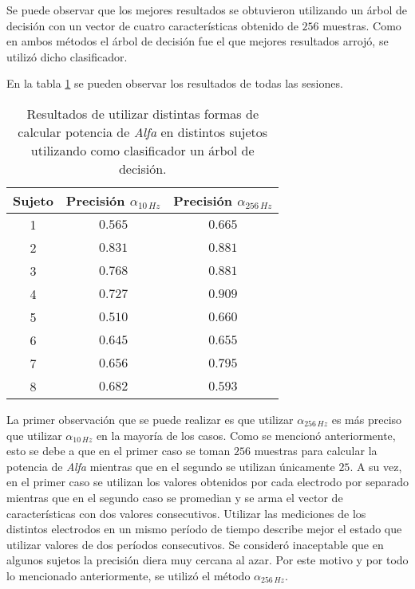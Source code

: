 Se puede observar que los mejores resultados se obtuvieron utilizando un árbol de decisión con un vector de cuatro características obtenido de $256$ muestras. Como en ambos métodos el árbol de decisión fue el que mejores resultados arrojó, se utilizó dicho clasificador.

En la tabla \ref{tab:eeg-results} se pueden observar los resultados de todas las sesiones.

\begin{table}[H]
\centering
\begin{tabular}{ |c|c|c| } 
 \hline
 Sujeto & Precisión $\alpha_{10 \, Hz}$ &  Precisión $\alpha_{256 \, Hz}$ \\ 
 \hline
 1 & $0.565$ & $0.665$ \\
 \hline
 2 & $0.831$ & $0.881$ \\
 \hline
 3 & $0.768$ & $0.881$ \\
 \hline
 4  & $0.727$ & $0.909$ \\
 \hline
  5 & $0.510$ & $0.660$ \\
 \hline
 6 & $0.645$ & $0.655$ \\
 \hline
 7 & $0.656$ & $0.795$ \\
 \hline
 8  & $0.682$ & $0.593$ \\
 \hline

 \hline
\end{tabular}
\caption{Resultados de utilizar distintas formas de calcular potencia de \emph{Alfa} en distintos sujetos utilizando como clasificador un árbol de decisión.}
\label{tab:eeg-results}
\end{table}

La primer observación que se puede realizar es que utilizar $\alpha_{256 \, Hz}$ es más preciso que utilizar $\alpha_{10 \, Hz}$ en la mayoría de los casos. Como se mencionó anteriormente, esto se debe a que en el primer caso se toman $256$ muestras para calcular la potencia de \emph{Alfa} mientras que en el segundo se utilizan únicamente $25$. A su vez, en el primer caso se utilizan los valores obtenidos por cada electrodo por separado mientras que en el segundo caso se promedian y se arma el vector de características con dos valores consecutivos. Utilizar las mediciones de los distintos electrodos en un mismo período de tiempo describe mejor el estado que utilizar valores de dos períodos consecutivos. Se consideró inaceptable que en algunos sujetos la precisión diera muy cercana al azar. Por este motivo y por todo lo mencionado anteriormente, se utilizó el método $\alpha_{256 \, Hz}$.

